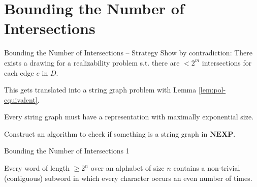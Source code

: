 \documentclass[10pt,aspectratio=169]{beamer}
\theoremstyle{plain}
\begin{document}
\section{Bounding the Number of Intersections}

\begin{frame}{Bounding the Number of Intersections -- Strategy}
    Show by contradiction: There exists a drawing for a realizability problem 
    s.t. there are \(< 2^m\) intersections for each edge \(e\) in \(D\).\pause

    This gets translated into a string graph problem with Lemma \ref{lem:pol-equivalent}.\pause

    Every string graph must have a representation with maximally exponential size.\pause

    Construct an algorithm to check if something is a string graph in \(\mathbf{NEXP}\).
\end{frame}

\begin{frame}{Bounding the Number of Intersections 1}
    \begin{lemma}
        Every word of length \(\geq 2^n\) over an alphabet of size \(n\) contains a non-trivial (contiguous) subword in which every character occurs an even number of times.
        \label{lem:even-occurrences}
    \end{lemma}
\end{frame}
\end{document}
